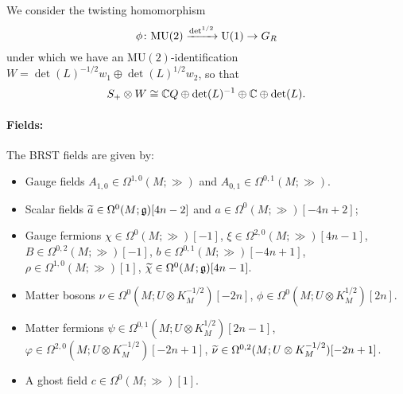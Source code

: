 \documentclass[10pt, oneside]{article}
\newcommand{\MU}{\mathrm{MU}}
\renewcommand{\U}{\mathrm{U}}
\begin{document}
We consider the twisting homomorphism 
\[
\phi \colon \MU(2) \xto{\det^{1/2}} \U(1) \rightarrow G_R
\]
under which we have an $\MU(2)$-identification $W=\det(L)^{-1/2}w_1 \oplus \det(L)^{1/2}w_2$, so that
\[S_+\otimes W\cong \CC Q\oplus \det(L)^{-1}\oplus \CC\oplus \det(L).\]

\vspace{-10pt}
\paragraph{Fields:} The BRST fields are given by:
\begin{itemize}
\item Gauge fields $A_{1, 0}\in\Omega^{1, 0}(M; \gg)$ and $A_{0, 1}\in\Omega^{0, 1}(M; \gg)$.
\item Scalar fields $\Tilde{a} \in \Omega^{0}(M; \gg)[4n-2]$ and $a \in\Omega^{0}(M; \gg)[-4n+2]$;
\item Gauge fermions $\chi \in \Omega^0(M ; \gg)[-1]$, $\xi \in \Omega^{2,0}(M ; \gg)[4n-1]$, $B \in \Omega^{0,2}(M ; \gg)[-1]$, $b \in \Omega^{0,1}(M ; \gg)[-4n+1]$, $\rho \in \Omega^{1,0}(M ; \gg)[1]$,  $\Tilde{\chi} \in \Omega^0(M ; \gg)[4n-1]$.
\item Matter bosons $\nu\in\Omega^0(M; U\otimes K_M^{-1/2})[-2n]$, $\phi\in\Omega^0(M; U\otimes K_M^{1/2})[2n]$.
\item Matter fermions $\psi \in \Omega^{0,1} (M ;  U\otimes K_M^{1/2})[2n-1]$, $\varphi \in \Omega^{2,0} (M ; U\otimes K_M^{-1/2})[-2n+1]$, $\Tilde{\nu} \in \Omega^{0,2}(M ; U\otimes K_M^{-1/2})[-2n+1]$.
\item A ghost field $c\in \Omega^0(M; \gg)[1]$.
\end{itemize}
\end{document}

